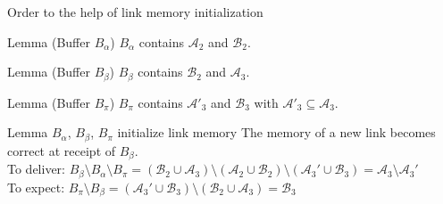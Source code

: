 \documentclass[10pt, xcolor={usenames, dvipsnames}]{beamer}
\begin{document}
\begin{frame}{Order to the help of link memory initialization}

  \begin{center}
    
  \end{center}

  \vspace{-1em}

  \begin{minipage}{0.325\textwidth}
    \begin{block}{Lemma (Buffer $B_\alpha$)}
      $B_\alpha$ contains $\mathcal{A}_2$ and $\mathcal{B}_2$.
    \end{block}
  \end{minipage}
  \begin{minipage}{0.325\textwidth}
    \begin{block}{Lemma (Buffer $B_\beta$)}
      $B_\beta$ contains $\mathcal{B}_2$ and $\mathcal{A}_3$.
    \end{block}
  \end{minipage}
  \begin{minipage}{0.325\textwidth}
    \begin{block}{Lemma (Buffer $B_\pi$)}
      $B_\pi$ contains $\mathcal{A'}_3$ and $\mathcal{B}_3$ with 
      $\mathcal{A}'_3 \subseteq \mathcal{A}_3$.
    \end{block}
  \end{minipage}
  
  \begin{block}{Lemma $B_\alpha$, $B_\beta$, $B_\pi$ initialize link memory}
    The memory of a new link becomes correct at receipt of $B_\beta$. \\
    To deliver:
    $B_\beta \setminus B_\alpha \setminus B_\pi = (\mathcal{B}_2 \cup
    \mathcal{A}_3) \setminus (\mathcal{A}_2 \cup \mathcal{B}_2) \setminus
    (\mathcal{A}_3' \cup \mathcal{B}_3) = \mathcal{A}_3 \setminus
    \mathcal{A}_3'$\\
    To expect:
    $B_\pi \setminus B_\beta = (\mathcal{A}_3' \cup \mathcal{B}_3) \setminus
    (\mathcal{B}_2 \cup \mathcal{A}_3) = \mathcal{B}_3$

  \end{block}   
    
\end{frame}
\end{document}

